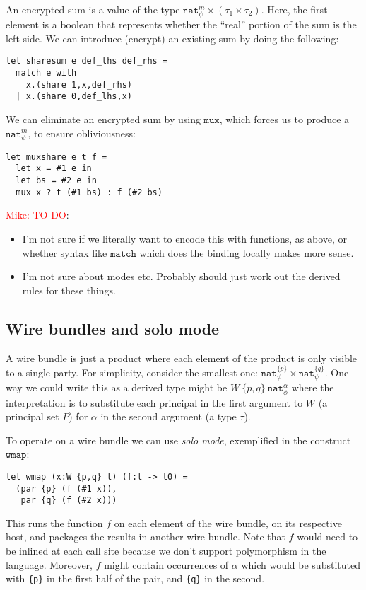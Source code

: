 \documentclass[10pt]{article}
\newcommand{\kw}[1]{\ensuremath{\mathtt{#1}}}
\newcommand{\tnat}{\ensuremath{\mathtt{nat}}}
\newcommand{\tprod}[2]{\ensuremath{{#1} \times {#2}}}
\newcommand{\mwh}[1]{\textcolor{red}{Mike: #1}}
\begin{document}
An encrypted sum is a value of the type
$\tprod{\tnat^m_\psi}{(\tprod{\tau_1}{\tau_2})}$. Here, the first
element is a boolean that represents whether the ``real'' portion of
the sum is the left side. We can introduce (encrypt) an existing sum
by doing the following:
\begin{verbatim}
let sharesum e def_lhs def_rhs =
  match e with
    x.(share 1,x,def_rhs)
  | x.(share 0,def_lhs,x)
\end{verbatim}
We can eliminate an encrypted sum by using $\kw{mux}$, which forces us
to produce a $\tnat^m_\psi$, to ensure obliviousness:
\begin{verbatim}
let muxshare e t f =
  let x = #1 e in
  let bs = #2 e in
  mux x ? t (#1 bs) : f (#2 bs)
\end{verbatim}

\mwh{TO DO}:
\begin{itemize}
\item I'm not sure if we literally want to encode this with functions,
  as above, or whether syntax like $\kw{match}$ which does the binding
  locally makes more sense.
\item I'm not sure about modes etc. Probably should just work out the
  derived rules for these things.
\end{itemize}
  
\subsection{Wire bundles and solo mode}

A wire bundle is just a product where each element of the product is
only visible to a single party. For simplicity, consider the smallest
one: $\tprod{\tnat^{\{p\}}_\psi}{\tnat^{\{q\}}_\psi}$. One way we
could write this as a derived type might be
$W~\{p,q\}~\tnat^\alpha_\phi$ where the interpretation is to
substitute each principal in the first argument to $W$ (a principal
set $P$) for $\alpha$ in the second argument (a type $\tau$).

To operate on a wire bundle we can use \emph{solo mode}, exemplified
in the construct $\kw{wmap}$:
\begin{verbatim}
let wmap (x:W {p,q} t) (f:t -> t0) =
  (par {p} (f (#1 x)), 
   par {q} (f (#2 x)))
\end{verbatim}
This runs the function $f$ on each element of the wire bundle, on its
respective host, and packages the results in another wire bundle. Note
that $f$ would need to be inlined at each call site because we don't
support polymorphism in the language. Moreover, $f$ might contain
occurrences of $\alpha$ which would  be substituted with
\texttt{\{p\}} in the first half of the pair, and \texttt{\{q\}} in
the second.
\end{document}
